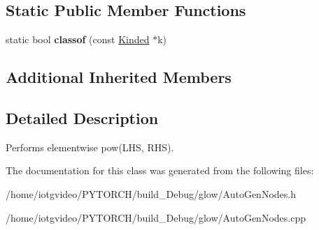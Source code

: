 \subsection*{Static Public Member Functions}
\begin{DoxyCompactItemize}
\item 
\mbox{\label{classglow_1_1_pow_node_a33314a1a9bf12088f31071695b812ad5}} 
static bool {\bfseries classof} (const \hyperlink{classglow_1_1_kinded}{Kinded} $\ast$k)
\end{DoxyCompactItemize}
\subsection*{Additional Inherited Members}


\subsection{Detailed Description}
Performs elementwise pow(\+L\+H\+S, R\+H\+S). 

The documentation for this class was generated from the following files\+:\begin{DoxyCompactItemize}
\item 
/home/iotgvideo/\+P\+Y\+T\+O\+R\+C\+H/build\+\_\+\+Debug/glow/Auto\+Gen\+Nodes.\+h\item 
/home/iotgvideo/\+P\+Y\+T\+O\+R\+C\+H/build\+\_\+\+Debug/glow/Auto\+Gen\+Nodes.\+cpp\end{DoxyCompactItemize}
